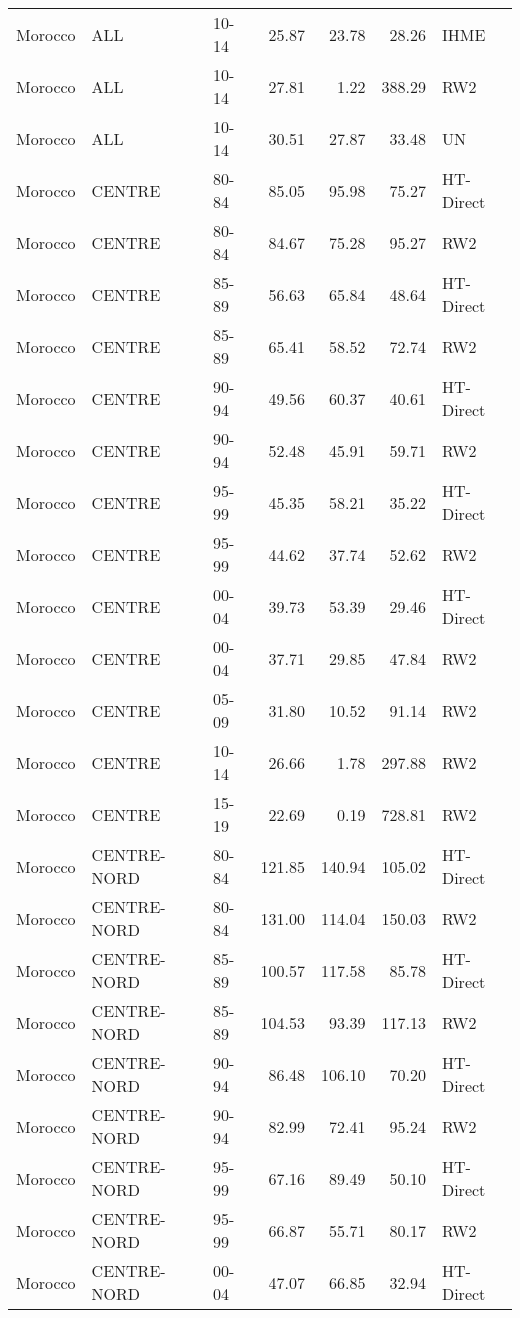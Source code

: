 \begin{longtable}{lllrrrl}
  Morocco & ALL & 10-14 & 25.87 & 23.78 & 28.26 & IHME \\ 
  Morocco & ALL & 10-14 & 27.81 & 1.22 & 388.29 & RW2 \\ 
  Morocco & ALL & 10-14 & 30.51 & 27.87 & 33.48 & UN \\ 
  Morocco & CENTRE & 80-84 & 85.05 & 95.98 & 75.27 & HT-Direct \\ 
  Morocco & CENTRE & 80-84 & 84.67 & 75.28 & 95.27 & RW2 \\ 
  Morocco & CENTRE & 85-89 & 56.63 & 65.84 & 48.64 & HT-Direct \\ 
  Morocco & CENTRE & 85-89 & 65.41 & 58.52 & 72.74 & RW2 \\ 
  Morocco & CENTRE & 90-94 & 49.56 & 60.37 & 40.61 & HT-Direct \\ 
  Morocco & CENTRE & 90-94 & 52.48 & 45.91 & 59.71 & RW2 \\ 
  Morocco & CENTRE & 95-99 & 45.35 & 58.21 & 35.22 & HT-Direct \\ 
  Morocco & CENTRE & 95-99 & 44.62 & 37.74 & 52.62 & RW2 \\ 
  Morocco & CENTRE & 00-04 & 39.73 & 53.39 & 29.46 & HT-Direct \\ 
  Morocco & CENTRE & 00-04 & 37.71 & 29.85 & 47.84 & RW2 \\ 
  Morocco & CENTRE & 05-09 & 31.80 & 10.52 & 91.14 & RW2 \\ 
  Morocco & CENTRE & 10-14 & 26.66 & 1.78 & 297.88 & RW2 \\ 
  Morocco & CENTRE & 15-19 & 22.69 & 0.19 & 728.81 & RW2 \\ 
  Morocco & CENTRE-NORD & 80-84 & 121.85 & 140.94 & 105.02 & HT-Direct \\ 
  Morocco & CENTRE-NORD & 80-84 & 131.00 & 114.04 & 150.03 & RW2 \\ 
  Morocco & CENTRE-NORD & 85-89 & 100.57 & 117.58 & 85.78 & HT-Direct \\ 
  Morocco & CENTRE-NORD & 85-89 & 104.53 & 93.39 & 117.13 & RW2 \\ 
  Morocco & CENTRE-NORD & 90-94 & 86.48 & 106.10 & 70.20 & HT-Direct \\ 
  Morocco & CENTRE-NORD & 90-94 & 82.99 & 72.41 & 95.24 & RW2 \\ 
  Morocco & CENTRE-NORD & 95-99 & 67.16 & 89.49 & 50.10 & HT-Direct \\ 
  Morocco & CENTRE-NORD & 95-99 & 66.87 & 55.71 & 80.17 & RW2 \\ 
  Morocco & CENTRE-NORD & 00-04 & 47.07 & 66.85 & 32.94 & HT-Direct \\ 

\end{longtable}
